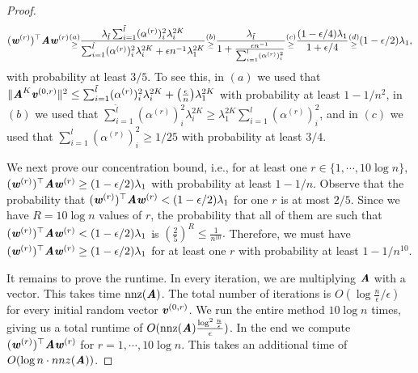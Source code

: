 \begin{proof}
\[
(\ww^{(r)})^{\top}\AA\ww^{(r)} \substack{(a)\\ \geq}  \frac{\lambda_{\tilde{l}}\sum_{i =1 }^{\tilde{l}}(\alpha^{(r)})^2_i \lambda_i^{2K}}{\sum_{i =1 }^{\tilde{l}}(\alpha^{(r)})^2_i \lambda_i^{2K} + \epsilon n^{-1}\lambda_1^{2K}} \substack{(b)\\ \geq} \frac{\lambda_{\tilde{l}}}{1+\frac{\epsilon n^{-1}}{\sum_{i=1}^l(\alpha^{(r)})_i^2} }\substack{(c)\\ \geq} \frac{(1-\epsilon/4)\lambda_1}{1+\epsilon/4}\substack{(d)\\\geq} (1-\epsilon/2)\lambda_1,
\]
with probability at least $3/5$. To see this, in $(a)$ we used that $\|\AA^K\vv^{(0,r)}\|^2 \leq \sum_{i =1 }^{\tilde{l}}(\alpha^{(r)})_i^2 \lambda_i^{2K}+\left(\frac{\epsilon}{n}\right)\lambda_1^{2K}$ with probability at least $1-1/n^2 $, in $(b)$ we used that $\sum_{i =1 }^{\tilde{l}}(\alpha^{(r)})^2_i \lambda_i^{2K} \geq \lambda_1^{2K}\sum_{i=1}^l (\alpha^{(r)})_i^2$, and in $(c)$ we used that $\sum_{i=1}^l(\alpha^{(r)})_i^2 \geq 1/25$ with probability at least $3/4$.

We next prove our concentration bound, i.e., for at least one $r \in \{1,\cdots, 10\log n\}$, $(\ww^{(r)})^{\top}\AA\ww^{(r)}\geq (1-\epsilon/2)\lambda_1$ with probability at least $1-1/n$. Observe that the probability that $(\ww^{(r)})^{\top}\AA\ww^{(r)}< (1-\epsilon/2)\lambda_1$ for one $r$ is at most $2/5$. Since we have $R = 10\log n$ values of $r$, the probability that all of them are such that $(\ww^{(r)})^{\top}\AA\ww^{(r)}< (1-\epsilon/2)\lambda_1$ is $\left(\frac{2}{5}\right)^{R} \leq \frac{1}{n^{10}}.$
%
Therefore, we must have $(\ww^{(r)})^{\top}\AA\ww^{(r)}\geq (1-\epsilon/2)\lambda_1$ for at least one $r$ with probability at least $1-1/n^{10}$.

It remains to prove the runtime. In every iteration, we are multiplying $\AA$ with a vector. This takes time $\nnz(\AA)$. The total number of iterations is $O(\log \frac{n}{\epsilon}/\epsilon)$ for every initial random vector $\vv^{(0,r)}$. We run the entire method $10\log n$ times, giving us a total runtime of $O(\nnz(\AA) \frac{\log^2 \frac{n}{\epsilon}}{\epsilon})$. In the end we compute $(\ww^{(r)})^{\top}\AA\ww^{(r)}$ for $r = 1,\cdots, 10\log n$. This takes an additional time of $O(\log n\cdot  nnz(\AA))$.


\end{proof}
